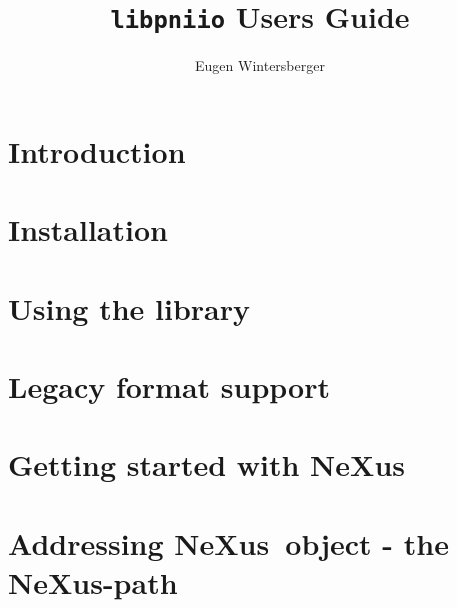 \documentclass[a4paper,draft]{scrbook}
\title{{\Huge{\tt libpniio} Users Guide}}
\author{Eugen Wintersberger}
\newcommand{\nexus}{NeXus}
\begin{document}
\maketitle
\tableofcontents
\listoftodos

\chapter{Introduction}\label{chapter:introduction}

\FloatBarrier

\chapter{Installation}\label{chapter:installation}

\FloatBarrier

\chapter{Using the library}\label{chapter:usage}

\FloatBarrier

\chapter{Legacy format support}\label{chapter:legacy_formats}

\FloatBarrier

\chapter{Getting started with \nexus}\label{chapter:nexus_quickstart}

\FloatBarrier

\chapter{Addressing \nexus\ object - the \nexus-path}\label{chapter:nxpath}

\FloatBarrier

\end{document}
